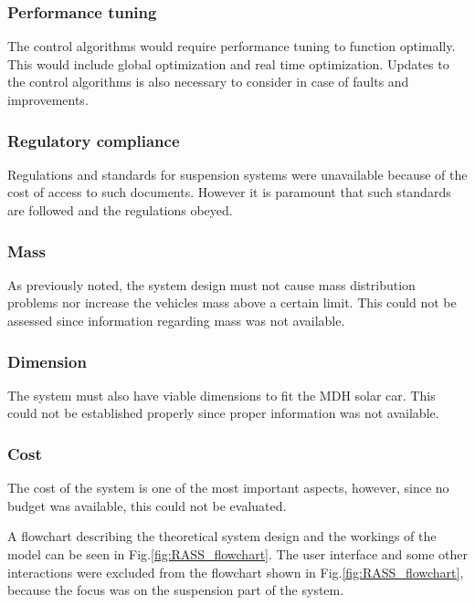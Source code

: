 \subsubsection{Performance tuning}
The control algorithms would require performance tuning to function optimally. This would include global optimization and real time optimization\:\cite{carlenerikssonEVHEVFramdrivning2023}. Updates to the control algorithms is also necessary to consider in case of faults and improvements.

\subsubsection{Regulatory compliance}
Regulations and standards for suspension systems were unavailable because of the cost of access to such documents. However it is paramount that such standards are followed and the regulations obeyed.

\subsubsection{Mass}
As previously noted, the system design must not cause mass distribution problems nor increase the vehicles mass above a certain limit. This could not be assessed since information regarding mass was not available.

\subsubsection{Dimension}
The system must also have viable dimensions to fit the MDH solar car. This could not be established properly since proper information was not available.

\subsubsection{Cost}
The cost of the system is one of the most important aspects, however, since no budget was available, this could not be evaluated.




A flowchart describing the theoretical system design and the workings of the model can be seen in Fig.\:\ref{fig:RASS_flowchart}. The user interface and some other interactions were excluded from the flowchart shown in Fig.\:\ref{fig:RASS_flowchart}, because the focus was on the suspension part of the system.

